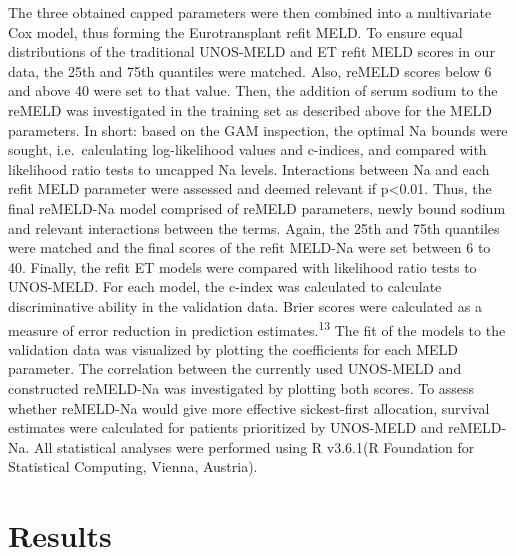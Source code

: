 \documentclass[11pt,english,]{book} %
\begin{document}
The three obtained capped parameters were then combined into a multivariate Cox model, thus forming the Eurotransplant refit MELD. To ensure equal distributions of the traditional UNOS-MELD and ET refit MELD scores in our data, the 25th and 75th quantiles were matched. Also, reMELD scores below 6 and above 40 were set to that value.
Then, the addition of serum sodium to the reMELD was investigated in the training set as described above for the MELD parameters. In short: based on the GAM inspection, the optimal Na bounds were sought, i.e.~calculating log-likelihood values and c-indices, and compared with likelihood ratio tests to uncapped Na levels. Interactions between Na and each refit MELD parameter were assessed and deemed relevant if p\textless0.01. Thus, the final reMELD-Na model comprised of reMELD parameters, newly bound sodium and relevant interactions between the terms. Again, the 25th and 75th quantiles were matched and the final scores of the refit MELD-Na were set between 6 to 40. Finally, the refit ET models were compared with likelihood ratio tests to UNOS-MELD. For each model, the c-index was calculated to calculate discriminative ability in the validation data. Brier scores were calculated as a measure of error reduction in prediction estimates.\textsuperscript{13} The fit of the models to the validation data was visualized by plotting the coefficients for each MELD parameter. The correlation between the currently used UNOS-MELD and constructed reMELD-Na was investigated by plotting both scores. To assess whether reMELD-Na would give more effective sickest-first allocation, survival estimates were calculated for patients prioritized by UNOS-MELD and reMELD-Na. All statistical analyses were performed using R v3.6.1(R Foundation for Statistical Computing, Vienna, Austria).

\hypertarget{results-1}{%
\section*{Results}\label{results-1}}
\end{document}
